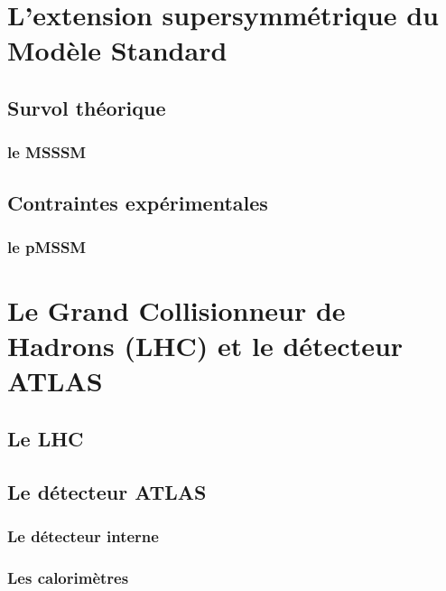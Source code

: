 \documentclass[12pt,canadien]{article}
\begin{document}
\singlespacing{}
\section{L'extension supersymmétrique du Modèle Standard}
\label{sec:susy}
\doublespacing{}

\subsection{Survol théorique}
\label{sec:susy:th}

\subsubsection{le MSSSM}
\label{sec:susy:th:mssm}

\subsection{Contraintes expérimentales}
\label{sec:susy:contraintes}

\subsubsection{le pMSSM}
\label{sec:susy:contraintes:pmssm}



\singlespacing{}
\section{Le Grand Collisionneur de Hadrons (LHC) et le détecteur
  ATLAS}
\label{sec:lhc_atlas}
\doublespacing{}

\subsection{Le LHC}
\label{sec:lhc_atlas:lhc}

\subsection{Le détecteur ATLAS}
\label{sec:lhc_atlas:atlas}

\subsubsection{Le détecteur interne}
\label{sec:lhc_atlas:atlas:indet}

\subsubsection{Les calorimètres}
\label{sec:lhc_atlas:atlas:calo}
\end{document}
